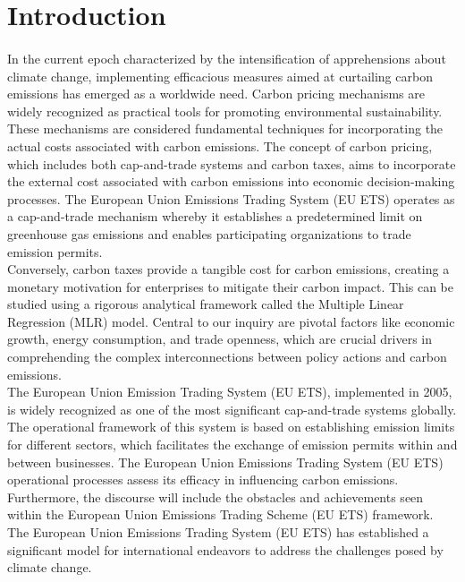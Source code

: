 \documentclass[12pt]{article}
\begin{document}
\section{Introduction}
\paragraph{}
In the current epoch characterized by the intensification of apprehensions about climate change, implementing efficacious measures aimed at curtailing carbon emissions has emerged as a worldwide need. Carbon pricing mechanisms are widely recognized as practical tools for promoting environmental sustainability. These mechanisms are considered fundamental techniques for incorporating the actual costs associated with carbon emissions. The concept of carbon pricing, which includes both cap-and-trade systems and carbon taxes, aims to incorporate the external cost associated with carbon emissions into economic decision-making processes. The European Union Emissions Trading System (EU ETS) operates as a cap-and-trade mechanism whereby it establishes a predetermined limit on greenhouse gas emissions and enables participating organizations to trade emission permits.
\\[\baselineskip]
Conversely, carbon taxes provide a tangible cost for carbon emissions, creating a monetary motivation for enterprises to mitigate their carbon impact. This can be studied using a rigorous analytical framework called the Multiple Linear Regression (MLR) model. Central to our inquiry are pivotal factors like economic growth, energy consumption, and trade openness, which are crucial drivers in comprehending the complex interconnections between policy actions and carbon emissions.
\\[\baselineskip]
The European Union Emission Trading System (EU ETS), implemented in 2005, is widely recognized as one of the most significant cap-and-trade systems globally. The operational framework of this system is based on establishing emission limits for different sectors, which facilitates the exchange of emission permits within and between businesses. The European Union Emissions Trading System (EU ETS) operational processes assess its efficacy in influencing carbon emissions. Furthermore, the discourse will include the obstacles and achievements seen within the European Union Emissions Trading Scheme (EU ETS) framework. The European Union Emissions Trading System (EU ETS) has established a significant model for international endeavors to address the challenges posed by climate change. 
\end{document}
